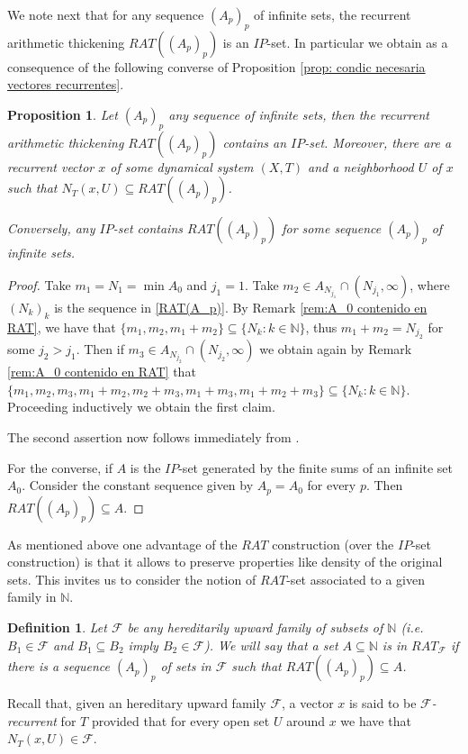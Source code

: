 \documentclass[11pt]{amsart}
\newtheorem{proposition}[theorem]{Proposition}
\newtheorem{definition}[theorem]{Definition}
\newcommand{\zN}{\mathbb N}
\newcommand{\sub}{\subseteq}
\begin{document}
    We note next that for any sequence $(A_p)_p$ of infinite sets, the recurrent arithmetic thickening $RAT((A_{p})_p)$ is an $IP$-set. In particular we obtain as a consequence of \cite[Theorem 2.17]{Fur81} the following converse of Proposition \ref{prop: condic necesaria vectores recurrentes}.
\begin{proposition}\label{prop: los RAT son IP}
    Let $(A_p)_p$ any sequence of infinite sets, then the recurrent arithmetic thickening $RAT((A_{p})_p)$ contains an $IP$-set.  Moreover, there are a recurrent vector $x$  of some dynamical system $(X,T)$ and a neighborhood $U$ of $x$ such that $N_T(x,U)\sub RAT((A_{p})_p)$.

    Conversely, any $IP$-set contains $RAT((A_{p})_p)$ for some sequence  $(A_p)_p$ of infinite sets.  
\end{proposition}
\begin{proof}
    Take $m_1=N_1=\min A_0$ and $j_1=1$. Take $m_2\in A_{N_{j_1}}\cap (N_{j_1},\infty)$, where $(N_k)_k$ is the sequence in \eqref{RAT(A_p)}.
    By Remark \ref{rem:A_0 contenido en RAT}, we have that $\{m_1,m_{2}, m_1+m_2\}\sub \{N_k:k\in \zN\}$, thus     $m_1+m_2=N_{j_{2}}$ for some $j_{2}> j_1$. Then if $m_3\in A_{N_{j_2}}\cap (N_{j_2},\infty)$ we obtain again by Remark \ref{rem:A_0 contenido en RAT} that $\{m_1,m_{2},m_3, m_1+m_2,m_2+m_3,m_1+m_3,m_1+m_2+m_3\}\sub \{N_k:k\in \zN\}$. Proceeding inductively we obtain the first claim. 

    The second assertion now follows immediately from \cite[Theorem 2.17]{Fur81}.


    For the converse, if $A$ is the $IP$-set generated by the finite sums of an infinite set $A_0$. Consider the constant sequence given by $A_p=A_0$ for every $p$. Then $RAT((A_{p})_p)\sub A.$
\end{proof}


As mentioned above one advantage of the $RAT$ construction (over the $IP$-set construction) is that it allows to preserve properties like density of the original sets. This invites us to consider the notion of $RAT$-set associated to a given family in $\zN$.
\begin{definition}
    Let $\mathcal F$ be any hereditarily upward family of subsets of $\zN$ (i.e. $B_1\in\mathcal F$ and $B_1 \sub B_2$ imply $B_2\in\mathcal F$). We will say that a set $A\sub\zN$ is in $RAT_{\mathcal F}$ if there is a sequence $(A_p)_p$ of sets in $\mathcal F$ such that $ RAT((A_{p})_p)\sub A$. 
\end{definition}
Recall that, given an hereditary upward family $\mathcal F$, a vector $x$ is said to be \textit{$\mathcal F$-recurrent} for $T$ provided that for every open set $U$ around $x$ we have that $N_T(x,U)\in \mathcal F$.
\end{document}

